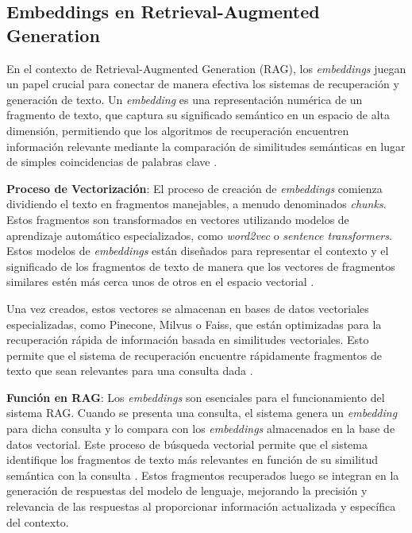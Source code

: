 \subsection{Embeddings en Retrieval-Augmented Generation}

En el contexto de Retrieval-Augmented Generation (RAG), los \textit{embeddings} juegan un papel crucial para conectar de manera efectiva los sistemas de recuperación y generación de texto. Un \textit{embedding} es una representación numérica de un fragmento de texto, que captura su significado semántico en un espacio de alta dimensión, permitiendo que los algoritmos de recuperación encuentren información relevante mediante la comparación de similitudes semánticas en lugar de simples coincidencias de palabras clave \cite{cloudgirl2023rag, datastax2023rag}.

\textbf{Proceso de Vectorización}: El proceso de creación de \textit{embeddings} comienza dividiendo el texto en fragmentos manejables, a menudo denominados \textit{chunks}. Estos fragmentos son transformados en vectores utilizando modelos de aprendizaje automático especializados, como \textit{word2vec} o \textit{sentence transformers}. Estos modelos de \textit{embeddings} están diseñados para representar el contexto y el significado de los fragmentos de texto de manera que los vectores de fragmentos similares estén más cerca unos de otros en el espacio vectorial \cite{nvidia2023rag}.

Una vez creados, estos vectores se almacenan en bases de datos vectoriales especializadas, como Pinecone, Milvus o Faiss, que están optimizadas para la recuperación rápida de información basada en similitudes vectoriales. Esto permite que el sistema de recuperación encuentre rápidamente fragmentos de texto que sean relevantes para una consulta dada \cite{datastax2023rag}.

\textbf{Función en RAG}: Los \textit{embeddings} son esenciales para el funcionamiento del sistema RAG. Cuando se presenta una consulta, el sistema genera un \textit{embedding} para dicha consulta y lo compara con los \textit{embeddings} almacenados en la base de datos vectorial. Este proceso de búsqueda vectorial permite que el sistema identifique los fragmentos de texto más relevantes en función de su similitud semántica con la consulta \cite{cloudgirl2023rag}. Estos fragmentos recuperados luego se integran en la generación de respuestas del modelo de lenguaje, mejorando la precisión y relevancia de las respuestas al proporcionar información actualizada y específica del contexto.

